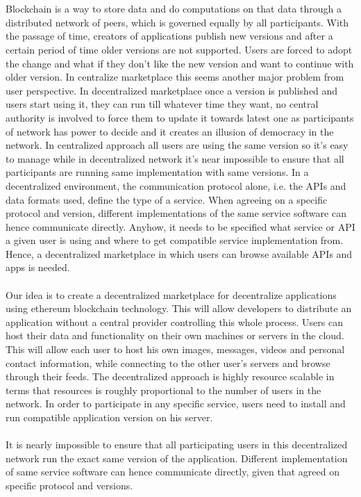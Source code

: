 \\
\\
Blockchain is a way to store data and do computations on that data through a distributed network of peers, which is governed equally by all participants. With the passage of time, creators of applications publish new versions and after a certain period of time older versions are not supported. Users are forced to adopt the change and what if they don't like the new version and want to continue with older version. In centralize marketplace this seems another major problem from user perspective. In decentralized marketplace once a version is published and users start using it, they can run till whatever time they want, no central authority is involved to force them to update it towards latest one as participants of network has power to decide and it creates an illusion of democracy in the network. In centralized approach all users are using the same version so it's easy to manage while in decentralized network it's near impossible to ensure that all participants are running same implementation with same versions. In a decentralized environment, the communication protocol alone, i.e. the APIs and data formats used, define the type of a service. When agreeing on a specific protocol and version, different implementations of the same service software can hence communicate directly. Anyhow, it needs to be specified what service or API a given user is using and where to get compatible service implementation from. Hence, a decentralized marketplace in which users can browse available APIs and apps is needed.\\
\\
Our idea is to create a decentralized marketplace for decentralize applications using ethereum blockchain technology. This will allow developers to distribute an application without a central provider controlling this whole process. Users can host their data and functionality on their own machines or servers in the cloud. This will allow each user to host his own images, messages, videos and personal contact information, while connecting to the other user's servers and browse through their feeds. The decentralized approach is highly resource scalable in terms that resources is roughly proportional to the number of users in the network. In order to participate in any specific service, users need to install and run compatible application version on his server.  
\\
\\
It is nearly impossible to ensure that all participating users in this decentralized network run the exact same version of the application. Different implementation of same service software can hence communicate directly, given that agreed on specific protocol and versions.

